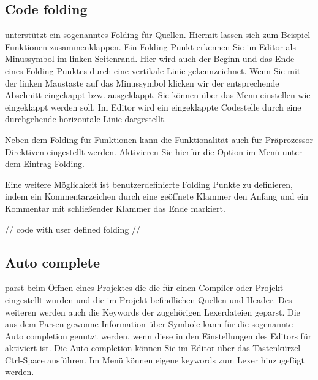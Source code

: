 \subsection{Code folding}

\codeblocks unterstützt ein sogenanntes Folding für Quellen. Hiermit lassen sich zum Beispiel Funktionen zusammenklappen. Ein Folding Punkt erkennen Sie im Editor als Minussymbol im linken Seitenrand. Hier wird auch der Beginn und das Ende eines Folding Punktes durch eine vertikale Linie gekennzeichnet. Wenn Sie mit der linken Maustaste auf das Minussymbol klicken wir der entsprechende Abschnitt eingekappt bzw. ausgeklappt. Sie können über das Menu  einstellen wie eingeklappt werden soll. Im Editor wird ein eingeklappte Codestelle durch eine durchgehende horizontale Linie dargestellt.


Neben dem Folding für Funktionen kann die Funktionalität auch für Präprozessor Direktiven eingestellt werden. Aktivieren Sie hierfür die Option  im Menü  unter dem Eintrag Folding.

Eine weitere Möglichkeit ist benutzerdefinierte Folding Punkte zu definieren, indem ein Kommentarzeichen durch eine geöffnete Klammer den Anfang und ein Kommentar mit schließender Klammer das Ende markiert.

\begin{code}
//{
code with user defined folding
//}
\end{code}


\subsection{Auto complete}

\codeblocks parst beim Öffnen eines Projektes die  die für einen Compiler oder Projekt eingestellt wurden und die im Projekt befindlichen Quellen und Header. Des weiteren werden auch die Keywords der zugehörigen Lexerdateien geparst. Die aus dem Parsen gewonne Information über Symbole kann für die sogenannte Auto completion genutzt werden, wenn diese in den Einstellungen des Editors für \codeblocks aktiviert ist. Die Auto completion können Sie im Editor über das Tastenkürzel Ctrl-Space ausführen. Im Menü  können eigene keywords zum Lexer hinzugefügt werden.


